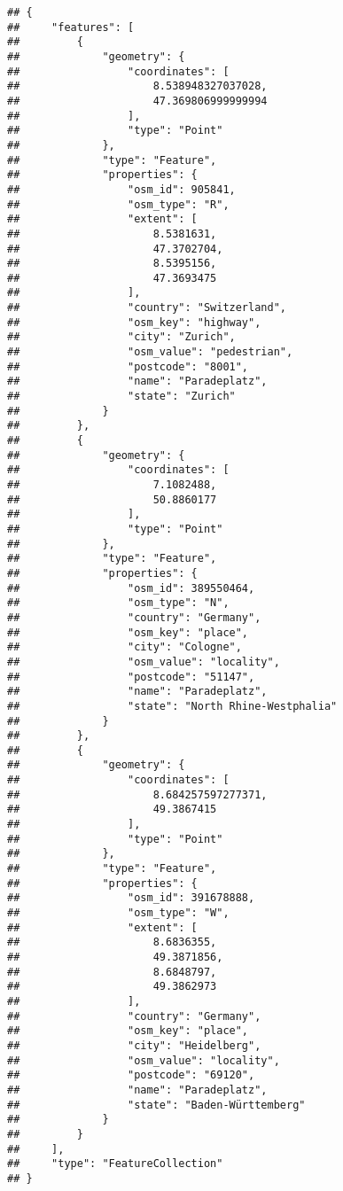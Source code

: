 \documentclass[]{book}
\begin{document}
\begin{verbatim}
## {
##     "features": [
##         {
##             "geometry": {
##                 "coordinates": [
##                     8.538948327037028,
##                     47.369806999999994
##                 ],
##                 "type": "Point"
##             },
##             "type": "Feature",
##             "properties": {
##                 "osm_id": 905841,
##                 "osm_type": "R",
##                 "extent": [
##                     8.5381631,
##                     47.3702704,
##                     8.5395156,
##                     47.3693475
##                 ],
##                 "country": "Switzerland",
##                 "osm_key": "highway",
##                 "city": "Zurich",
##                 "osm_value": "pedestrian",
##                 "postcode": "8001",
##                 "name": "Paradeplatz",
##                 "state": "Zurich"
##             }
##         },
##         {
##             "geometry": {
##                 "coordinates": [
##                     7.1082488,
##                     50.8860177
##                 ],
##                 "type": "Point"
##             },
##             "type": "Feature",
##             "properties": {
##                 "osm_id": 389550464,
##                 "osm_type": "N",
##                 "country": "Germany",
##                 "osm_key": "place",
##                 "city": "Cologne",
##                 "osm_value": "locality",
##                 "postcode": "51147",
##                 "name": "Paradeplatz",
##                 "state": "North Rhine-Westphalia"
##             }
##         },
##         {
##             "geometry": {
##                 "coordinates": [
##                     8.684257597277371,
##                     49.3867415
##                 ],
##                 "type": "Point"
##             },
##             "type": "Feature",
##             "properties": {
##                 "osm_id": 391678888,
##                 "osm_type": "W",
##                 "extent": [
##                     8.6836355,
##                     49.3871856,
##                     8.6848797,
##                     49.3862973
##                 ],
##                 "country": "Germany",
##                 "osm_key": "place",
##                 "city": "Heidelberg",
##                 "osm_value": "locality",
##                 "postcode": "69120",
##                 "name": "Paradeplatz",
##                 "state": "Baden-Württemberg"
##             }
##         }
##     ],
##     "type": "FeatureCollection"
## }
\end{verbatim}
\end{document}
